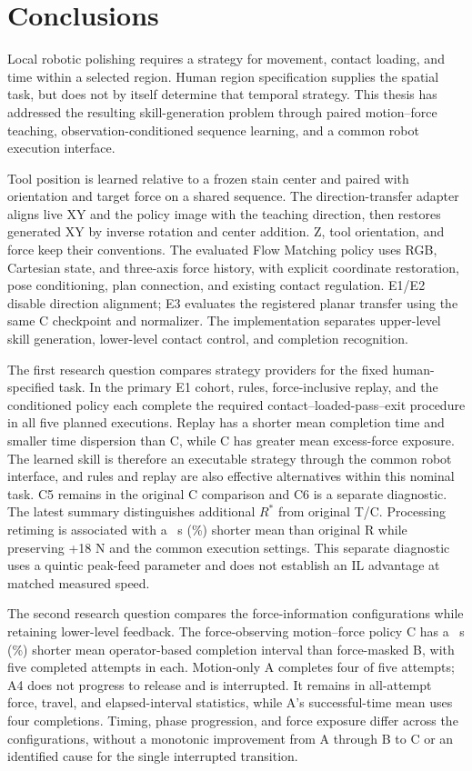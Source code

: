 \chapter{Conclusions}
\label{chap:conclusions}

Local robotic polishing requires a strategy for movement, contact loading, and time within a selected region. Human region specification supplies the spatial task, but does not by itself determine that temporal strategy. This thesis has addressed the resulting skill-generation problem through paired motion--force teaching, observation-conditioned sequence learning, and a common robot execution interface.

Tool position is learned relative to a frozen stain center and paired with orientation and target force on a shared sequence. The direction-transfer adapter aligns live XY and the policy image with the teaching direction, then restores generated XY by inverse rotation and center addition. Z, tool orientation, and force keep their conventions. The evaluated Flow Matching policy uses RGB, Cartesian state, and three-axis force history, with explicit coordinate restoration, pose conditioning, plan connection, and existing contact regulation. E1/E2 disable direction alignment; E3 evaluates the registered planar transfer using the same C checkpoint and normalizer. The implementation separates upper-level skill generation, lower-level contact control, and completion recognition.

The first research question compares strategy providers for the fixed human-specified task. In the primary E1 cohort, rules, force-inclusive replay, and the conditioned policy each complete the required contact--loaded-pass--exit procedure in all five planned executions. Replay has a shorter mean completion time and smaller time dispersion than C, while C has greater mean excess-force exposure. The learned skill is therefore an executable strategy through the common robot interface, and rules and replay are also effective alternatives within this nominal task. C5 remains in the original C comparison and C6 is a separate diagnostic. The latest summary distinguishes additional \(R^{*}\) from original T/C. Processing retiming is associated with a \RstarTimeGain~s (\RstarTimePercent\%) shorter mean than original R while preserving +18 N and the common execution settings. This separate diagnostic uses a quintic peak-feed parameter and does not establish an IL advantage at matched measured speed.

The second research question compares the force-information configurations while retaining lower-level feedback. The force-observing motion--force policy C has a \BCSeconds~s (\BCPercent\%) shorter mean operator-based completion interval than force-masked B, with five completed attempts in each. Motion-only A completes four of five attempts; A4 does not progress to release and is interrupted. It remains in all-attempt force, travel, and elapsed-interval statistics, while A's successful-time mean uses four completions. Timing, phase progression, and force exposure differ across the configurations, without a monotonic improvement from A through B to C or an identified cause for the single interrupted transition.

